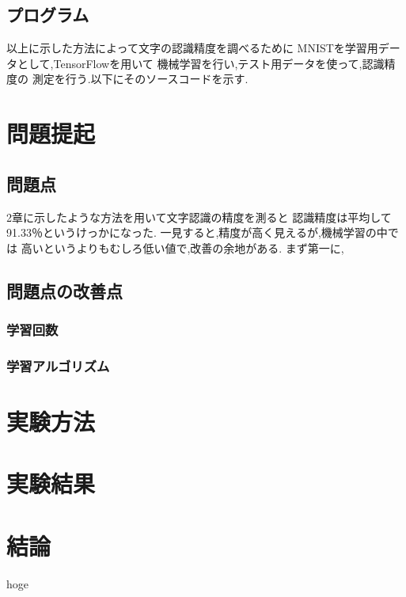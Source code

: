 \documentclass[12pt, a4paper, titlepage]{jarticle}
\begin{document}
		\subsection{プログラム}
			以上に示した方法によって文字の認識精度を調べるために
			MNISTを学習用データとして,TensorFlowを用いて
			機械学習を行い,テスト用データを使って,認識精度の
			測定を行う.以下にそのソースコードを示す.
			
	\section{問題提起}
		\subsection{問題点}
			2章に示したような方法を用いて文字認識の精度を測ると
			認識精度は平均して91.33％というけっかになった.
			一見すると,精度が高く見えるが,機械学習の中では
			高いというよりもむしろ低い値で,改善の余地がある.
			まず第一に,
		\subsection{問題点の改善点}
			\subsubsection{学習回数}
			\subsubsection{学習アルゴリズム}

	\section{実験方法}
	\section{実験結果}
	\section{結論}

	\begin{thebibliography}{9}
		 hoge
	\end{thebibliography}
\end{document}
